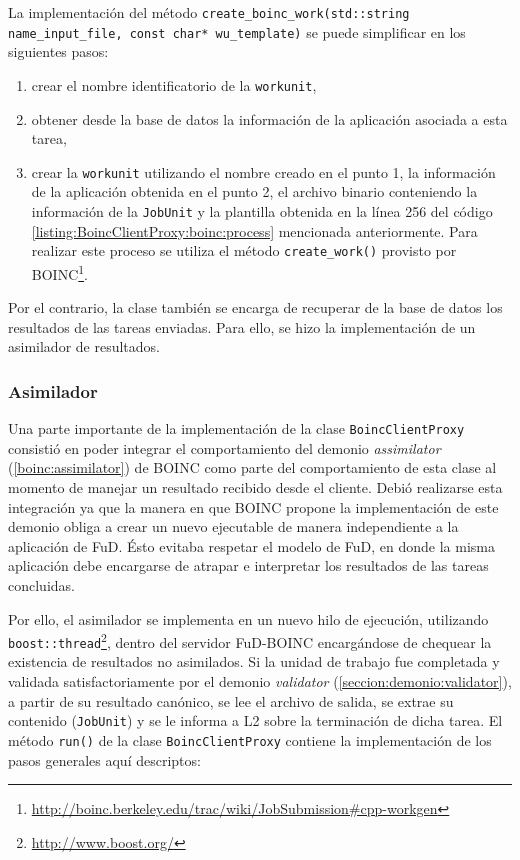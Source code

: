 La implementación del método \texttt{create\_boinc\_work(std::string name\_input\_file, const char* wu\_template)} se puede simplificar en los siguientes pasos:

\begin{enumerate}
\item crear el nombre identificatorio de la \texttt{workunit},
\item obtener desde la base de datos la información de la aplicación asociada a esta tarea,
\item crear la \texttt{workunit} utilizando el nombre creado en el punto 1, la información de la aplicación obtenida en el punto 2, el archivo binario conteniendo la información de la \texttt{JobUnit} y la plantilla obtenida en la línea 256 del código  \ref{listing:BoincClientProxy:boinc:process} mencionada anteriormente. Para realizar este proceso se utiliza el método \texttt{create\_work()} provisto por BOINC\footnote{\url{http://boinc.berkeley.edu/trac/wiki/JobSubmission\#cpp-workgen}}.
\end{enumerate}

Por el contrario, la clase también se encarga de recuperar de la base de datos los resultados de las tareas enviadas. Para ello, se hizo la implementación de un asimilador de resultados.

	\subsubsection{Asimilador}
	\label{seccion:asimilador}
Una parte importante de la implementación de la clase \texttt{BoincClientProxy} consistió en poder integrar el comportamiento del demonio \textit{assimilator} (\ref{boinc:assimilator}) de BOINC como parte del comportamiento de esta clase al momento de manejar un resultado recibido desde el cliente. Debió realizarse esta integración ya que la manera en que BOINC propone la implementación de este demonio obliga a crear un nuevo ejecutable de manera independiente a la aplicación de FuD. Ésto evitaba respetar el modelo de FuD, en donde la misma aplicación debe encargarse de atrapar e interpretar los resultados de las tareas concluidas.

Por ello, el asimilador se implementa en un nuevo hilo de ejecución, utilizando \texttt{boost::thread}\footnote{\url{http://www.boost.org/}}, dentro del servidor FuD-BOINC encargándose de chequear la existencia de resultados no asimilados. Si la unidad de trabajo fue completada y validada satisfactoriamente por el demonio \textit{validator} (\ref{seccion:demonio:validator}), a partir de su resultado canónico, se lee el archivo de salida, se extrae su contenido (\texttt{JobUnit}) y se le informa a L2 sobre la terminación de dicha tarea. El método \texttt{run()} de la clase \texttt{BoincClientProxy} contiene la implementación de los pasos generales aquí descriptos:

